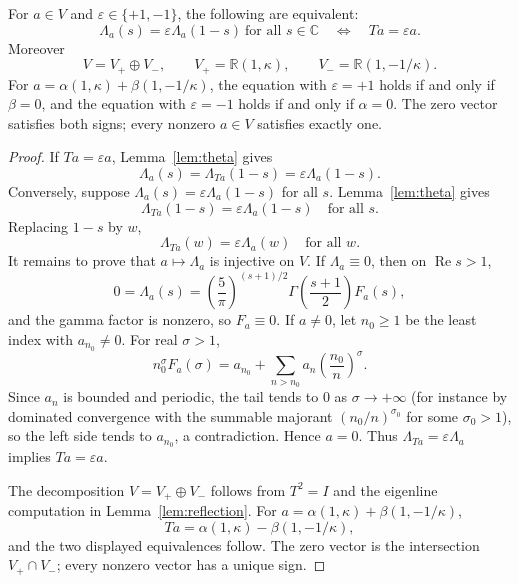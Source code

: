 \begin{theorem}\label{thm:fe-classification}
For \(a\in V\) and \(\varepsilon\in\{+1,-1\}\), the following are equivalent:
\[
\Lambda_a(s)=\varepsilon\Lambda_a(1-s)\ \text{for all }s\in\mathbb C
\quad\Longleftrightarrow\quad
Ta=\varepsilon a.
\]
Moreover
\[
V=V_+\oplus V_-,
\qquad
V_+=\mathbb R(1,\kappa),
\qquad
V_-=\mathbb R(1,-1/\kappa).
\]
For \(a=\alpha(1,\kappa)+\beta(1,-1/\kappa)\), the equation with \(\varepsilon=+1\) holds if and only if \(\beta=0\), and the equation with \(\varepsilon=-1\) holds if and only if \(\alpha=0\). The zero vector satisfies both signs; every nonzero \(a\in V\) satisfies exactly one.
\end{theorem}

\begin{proof}
If \(Ta=\varepsilon a\), Lemma~\ref{lem:theta} gives
\[
\Lambda_a(s)=\Lambda_{Ta}(1-s)=\varepsilon\Lambda_a(1-s).
\]
Conversely, suppose \(\Lambda_a(s)=\varepsilon\Lambda_a(1-s)\) for all \(s\). Lemma~\ref{lem:theta} gives
\[
\Lambda_{Ta}(1-s)=\varepsilon\Lambda_a(1-s)
\quad\text{for all }s.
\]
Replacing \(1-s\) by \(w\),
\[
\Lambda_{Ta}(w)=\varepsilon\Lambda_a(w)
\quad\text{for all }w.
\]
It remains to prove that \(a\mapsto\Lambda_a\) is injective on \(V\). If \(\Lambda_a\equiv0\), then on \(\operatorname{Re}s>1\),
\[
0=\Lambda_a(s)=\left(\frac5\pi\right)^{(s+1)/2}
\Gamma\!\left(\frac{s+1}{2}\right)F_a(s),
\]
and the gamma factor is nonzero, so \(F_a\equiv0\). If \(a\neq0\), let \(n_0\ge1\) be the least index with \(a_{n_0}\neq0\). For real \(\sigma>1\),
\[
n_0^\sigma F_a(\sigma)
=a_{n_0}+\sum_{n>n_0}a_n\left(\frac{n_0}{n}\right)^\sigma.
\]
Since \(a_n\) is bounded and periodic, the tail tends to \(0\) as \(\sigma\to+\infty\) (for instance by dominated convergence with the summable majorant \((n_0/n)^{\sigma_0}\) for some \(\sigma_0>1\)), so the left side tends to \(a_{n_0}\), a contradiction. Hence \(a=0\). Thus \(\Lambda_{Ta}=\varepsilon\Lambda_a\) implies \(Ta=\varepsilon a\).

The decomposition \(V=V_+\oplus V_-\) follows from \(T^2=I\) and the eigenline computation in Lemma~\ref{lem:reflection}. For \(a=\alpha(1,\kappa)+\beta(1,-1/\kappa)\),
\[
Ta=\alpha(1,\kappa)-\beta(1,-1/\kappa),
\]
and the two displayed equivalences follow. The zero vector is the intersection \(V_+\cap V_-\); every nonzero vector has a unique sign.
\end{proof}

